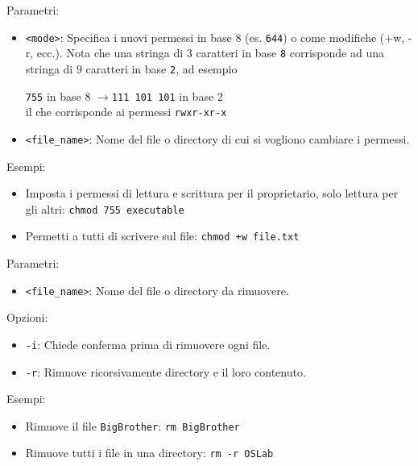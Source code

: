 \vskip3mm
Parametri:
\begin{itemize}
	\item \verb|<mode>|: Specifica i nuovi permessi in base 8 (es. \verb|644|) o come modifiche (+w, -r, ecc.).
	      \vskip3mm
	      Nota che una stringa di 3 caratteri in base \verb|8| corrisponde ad una stringa di $ 9 $ caratteri in base \verb|2|, ad esempio
	      \begin{center}
		      \verb|755| in base 8 $ \rightarrow  $\verb|111 101 101| in base 2 \\
		      il che corrisponde ai permessi \verb|rwxr-xr-x|
	      \end{center}
	\item \verb|<file_name>|: Nome del file o directory di cui si vogliono cambiare i permessi.
\end{itemize}
Esempi:
\begin{itemize}
	\item Imposta i permessi di lettura e scrittura per il proprietario, solo lettura per gli altri:
	      \vskip3mm
	      \verb|chmod 755 executable|
	\item Permetti a tutti di scrivere sul file:
	      \vskip3mm
	      \verb|chmod +w file.txt|
\end{itemize}

\vskip3mm
Parametri:
\begin{itemize}
	\item \verb|<file_name>|: Nome del file o directory da rimuovere.
\end{itemize}
Opzioni:
\begin{itemize}
	\item \verb|-i|: Chiede conferma prima di rimuovere ogni file.
	\item \verb|-r|: Rimuove ricorsivamente directory e il loro contenuto.
\end{itemize}
Esempi:
\begin{itemize}
	\item Rimuove il file \verb|BigBrother|:
	      \vskip3mm
	      \verb|rm BigBrother|
	\item Rimuove tutti i file in una directory:
	      \vskip3mm
	      \verb|rm -r OSLab|
\end{itemize}

